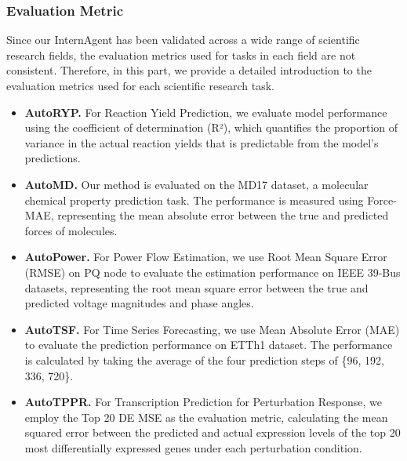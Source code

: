 \subsubsection{Evaluation Metric}
Since our InternAgent has been validated across a wide range of scientific research fields, the evaluation metrics used for tasks in each field are not consistent. Therefore, in this part, we provide a detailed introduction to the evaluation metrics used for each scientific research task.

\begin{itemize}
    \item \textbf{AutoRYP.} For Reaction Yield Prediction, we evaluate model performance using the coefficient of determination (R²), which quantifies the proportion of variance in the actual reaction yields that is predictable from the model's predictions.
    \item \textbf{AutoMD.} Our method is evaluated on the MD17 dataset, a molecular chemical property prediction task. The performance is measured using Force-MAE, representing the mean absolute error between the true and predicted forces of molecules.
    \item  \textbf{AutoPower.} For Power Flow Estimation, we use Root Mean Square Error (RMSE) on PQ node to evaluate the estimation performance on IEEE 39-Bus datasets, representing the root mean square error between the true and predicted voltage magnitudes and phase angles.

    \item  \textbf{AutoTSF.}  For Time Series Forecasting, we use Mean Absolute Error (MAE) to evaluate the prediction performance on ETTh1 dataset. The performance is calculated by taking the average of the four prediction steps of \{96, 192, 336, 720\}.
    
    \item  \textbf{AutoTPPR.} For Transcription Prediction for Perturbation Response, we employ the Top 20 DE MSE as the evaluation metric, calculating the mean squared error between the predicted and actual expression levels of the top 20 most differentially expressed genes under each perturbation condition.
    

\end{itemize}
